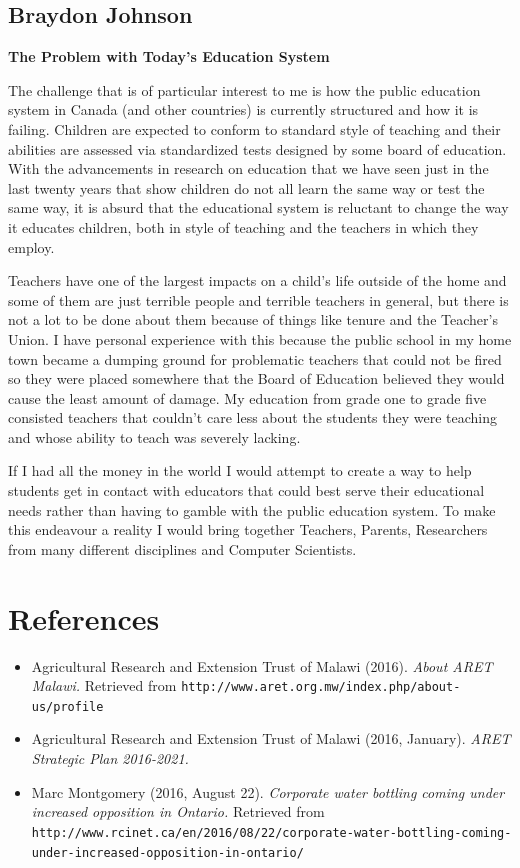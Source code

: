 \documentclass[12pt,letterpaper]{article}
\begin{document}
\subsection{Braydon Johnson}
\textbf{The Problem with Today's Education System}\par
The challenge that is of particular interest to me is how the public education system in Canada (and other countries) is currently structured and how it is failing. Children are expected to conform to standard style of teaching and their abilities are assessed via standardized tests designed by some board of education. With the advancements in research on education that we have seen just in the last twenty years that show children do not all learn the same way or test the same way, it is absurd that the educational system is reluctant to change the way it educates children, both in style of teaching and the teachers in which they employ.\par
Teachers have one of the largest impacts on a child's life outside of the home and some of them are just terrible people and terrible teachers in general,  but there is not a lot to be done about them because of things like tenure and the Teacher's Union. I have personal experience with this because the public school in my home town became a dumping ground for problematic teachers that could not be fired so they were placed somewhere that the Board of Education believed they would cause the least amount of damage. My education from grade one to grade five consisted teachers that couldn't care less about the students they were teaching and whose ability to teach was severely lacking.\par
If I had all the money in the world I would attempt to create a way to help students get in contact with educators that could best serve their educational needs rather than having to gamble with the public education system. To make this endeavour a reality I would bring together Teachers, Parents, Researchers from many different disciplines and Computer Scientists.

\clearpage
\section{References}

\begin{itemize}[leftmargin=12pt]
\item Agricultural Research and Extension Trust of Malawi (2016). \emph{About ARET Malawi.}
Retrieved from \texttt{http://www.aret.org.mw/index.php/about-us/profile}

\item Agricultural Research and Extension Trust of Malawi (2016, January). \emph{ARET Strategic Plan 2016-2021.}

\item Marc Montgomery (2016, August 22). \emph{Corporate water bottling coming under increased opposition in Ontario.} Retrieved from\\ \texttt{http://www.rcinet.ca/en/2016/08/22/corporate-water-bottling-coming-under-increased-opposition-in-ontario/}



\end{itemize}
\end{document}
